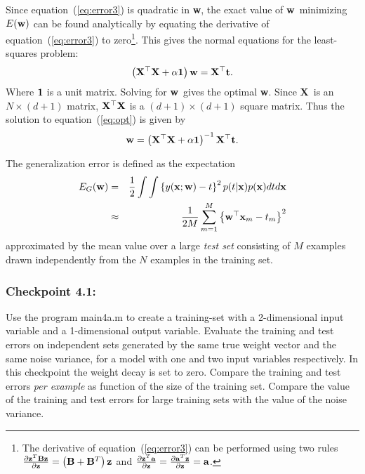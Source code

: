 \documentclass[times,12pt]{article}    %
\def\x{{\bf x}}
\def\X{{\bf X}}
\def\w{{\bf w}}
\def\t{{\bf t}}
\def\z{{\bf z}}
\begin{document}
Since equation~(\ref{eq:error3}) is quadratic in \w, the exact value
of \w\ minimizing $E(\w)$ can be found analytically by equating the
derivative of equation~(\ref{eq:error3}) to zero\footnote{The derivative of equation~(\ref{eq:error3}) can be performed using two rules $\frac{{\partial {\z}^T {\bf Bz}}}{{\partial {\z}}} = \left( {{\bf B} + {\bf B}^T } \right){\z}
$ and $\frac{{\partial {\z}^T {\bf a}}}{{\partial {\z}}} = \frac{{\partial {\bf a}^T {\z}}}{{\partial {\z}}} =  {\bf a}$.}. This gives the
normal equations for the least-squares problem:
\begin{equation}
  \label{eq:opt}
  \left(\X^\top \X + \alpha {\bf 1}\right) \w = \X^\top \t.
\end{equation}
Where ${\bf 1}$ is a unit matrix. Solving for \w\ gives the optimal \w.
Since \X\ is an $N\times (d+1)$ matrix, $\X^\top \X$ is a $(d+1)\times
(d+1)$ square matrix. Thus the solution to equation~(\ref{eq:opt}) is
given by
\begin{equation}
  \label{eq:sol}
  \w = \left(\X^\top \X +\alpha {\bf 1}\right)^{-1} \X^\top \t.
\end{equation}

The generalization error is defined as the expectation
\begin{eqnarray}
  \label{eq:gen1}
  E_G(\w) &=& \frac{1}{2} \int\int \left\{ y(\x;\w)-t \right\}^2 p(t|\x)p(\x)dtd\x\\
  \label{eq:gen2}
       &\approx&  \frac{1}{2M} \sum_{m=1}^M \left\{ \w^\top\x_m -t_m  \right\}^2
\end{eqnarray}
approximated by the mean value over a large {\it test set} consisting of $M$ examples
drawn independently from the $N$ examples in the training set.


\subsubsection*{Checkpoint 4.1:}
Use the program {\sf main4a.m} to create a training-set with a
2-dimensional input variable and a 1-dimensional output
variable. Evaluate the training and test errors on independent sets generated by the
same true weight vector and the same noise variance, for a model with one and two
input variables respectively. In this checkpoint the weight decay is set
to zero. Compare the training and test errors {\it per example}
as function of the size of the training set. Compare the value of the training and test
errors for large training sets with the value of the noise variance.
\end{document}
